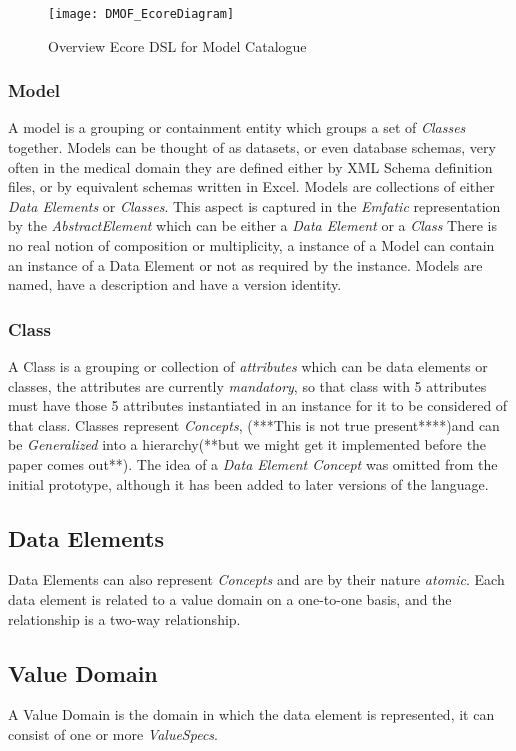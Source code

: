 \begin{figure}[here]
	\texttt{[image: DMOF\_EcoreDiagram]}
	\caption{Overview Ecore DSL for Model Catalogue} 
	\label{fig:mcSimplifiedOverview}
\end{figure}

\subsubsection{Model}
A model is a grouping or containment entity which groups a set of \emph{Classes} together. Models can be thought of as datasets, or even database schemas, very often in the medical domain they are defined either by XML Schema definition files, or by equivalent schemas written in Excel. 
Models are collections of either \emph{Data Elements} or \emph{Classes}. This aspect is captured in the \emph{Emfatic} representation by the \emph{AbstractElement} which can be either a  \emph{Data Element} or a \emph{Class}  There is no real notion of composition or multiplicity, a instance of a Model can contain an instance of a Data Element or not as required by the instance.  Models are named, have a description and have a version identity.
\subsubsection{Class}
A Class is a grouping or collection of \emph{attributes} which can be data elements or classes, the attributes are currently \emph{mandatory}, so that class with 5 attributes must have those 5 attributes instantiated in an instance for it to be considered of that class. Classes represent \emph{Concepts}, (***This is not true present****)and can be \emph{Generalized} into a hierarchy(**but we might get it implemented before the paper comes out**). The idea of a \emph{Data Element Concept} was omitted from the initial prototype, although it has been added to later versions of the language.
\subsection{Data Elements} 
Data Elements can also represent \emph{Concepts} and are by their nature \emph{atomic}.  Each data element is related to a value domain on a one-to-one basis, and the relationship is a two-way relationship.
\subsection{Value Domain}
A Value Domain is the domain in which the data element is represented, it can consist of one or more \emph{ValueSpecs}.
